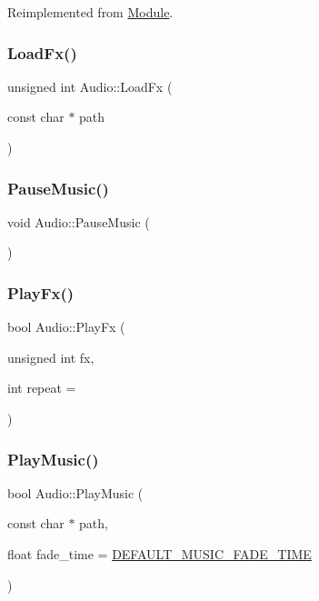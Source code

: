 Reimplemented from \mbox{\hyperlink{class_module_a77d7a006e42c0bd10110e1adbd4598cb}{Module}}.

\mbox{\label{class_audio_acd67418cbdb4aee0da2ca9592d3b38ea}} 
\subsubsection{\texorpdfstring{LoadFx()}{LoadFx()}}
{\footnotesize\ttfamily unsigned int Audio\+::\+Load\+Fx (\begin{DoxyParamCaption}\item[{const char $\ast$}]{path }\end{DoxyParamCaption})}

\mbox{\label{class_audio_a46bedb8e99e838dbf37bb164a4296e47}} 
\subsubsection{\texorpdfstring{PauseMusic()}{PauseMusic()}}
{\footnotesize\ttfamily void Audio\+::\+Pause\+Music (\begin{DoxyParamCaption}{ }\end{DoxyParamCaption})}

\mbox{\label{class_audio_a2903ef06d3f8b877a268074d3671e1ca}} 
\subsubsection{\texorpdfstring{PlayFx()}{PlayFx()}}
{\footnotesize\ttfamily bool Audio\+::\+Play\+Fx (\begin{DoxyParamCaption}\item[{unsigned int}]{fx,  }\item[{int}]{repeat = {} }\end{DoxyParamCaption})}

\mbox{\label{class_audio_a66356dc0e001dde301e79aac0ec76895}} 
\subsubsection{\texorpdfstring{PlayMusic()}{PlayMusic()}}
{\footnotesize\ttfamily bool Audio\+::\+Play\+Music (\begin{DoxyParamCaption}\item[{const char $\ast$}]{path,  }\item[{float}]{fade\+\_\+time = {\ttfamily \mbox{\hyperlink{_audio_8h_a06c542270f4bcee6a472e015d5ab8d08}{D\+E\+F\+A\+U\+L\+T\+\_\+\+M\+U\+S\+I\+C\+\_\+\+F\+A\+D\+E\+\_\+\+T\+I\+ME}}} }\end{DoxyParamCaption})}



